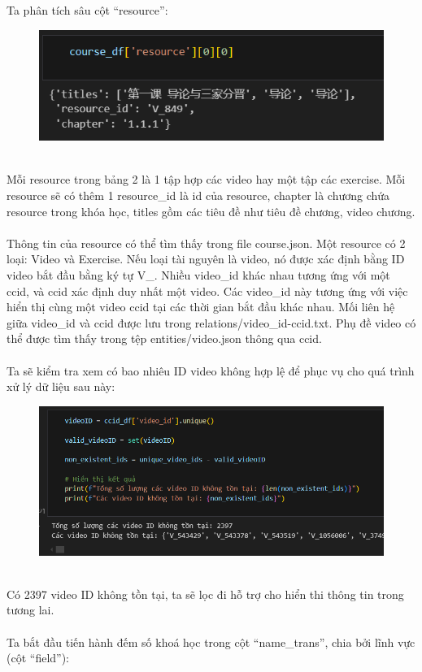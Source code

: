 Ta phân tích sâu cột “resource”:
\begin{figure}[h]
    \centering
    \includegraphics[width=0.75\linewidth]{figures/10.png}
\end{figure}\\
Mỗi resource trong bảng 2 là 1 tập hợp các video hay một tập các exercise. Mỗi resource sẽ có thêm 1 resource\_id là id của resource, chapter là chương chứa resource trong khóa học, titles gồm các tiêu đề như tiêu đề chương, video chương.\\
\\
Thông tin của resource có thể tìm thấy trong file course.json. Một resource có 2 loại: Video và Exercise. Nếu loại tài nguyên là video, nó được xác định bằng ID video bắt đầu bằng ký tự V\_. Nhiều video\_id khác nhau tương ứng với một ccid, và ccid xác định duy nhất một video. Các video\_id này tương ứng với việc hiển thị cùng một video ccid tại các thời gian bắt đầu khác nhau. Mối liên hệ giữa video\_id và ccid được lưu trong relations/video\_id-ccid.txt. Phụ đề video có thể được tìm thấy trong tệp entities/video.json thông qua ccid.\\
\\
Ta sẽ kiểm tra xem có bao nhiêu ID video không hợp lệ để phục vụ cho quá trình xử lý dữ liệu sau này:
\begin{figure}[h]
    \centering
    \includegraphics[width=0.75\linewidth]{figures/11.png}
\end{figure}\\
Có 2397 video ID không tồn tại, ta sẽ lọc đi hỗ trợ cho hiển thi thông tin trong tương lai.\\
\\
Ta bắt đầu tiến hành đếm số khoá học trong cột “name\_trans”, chia bởi lĩnh vực (cột “field”):\\
